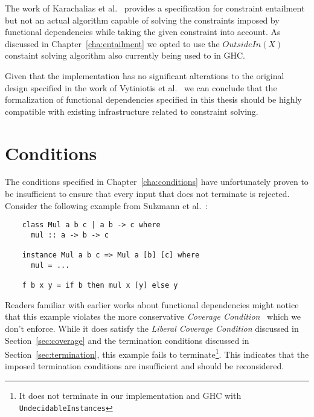 The work of Karachalias et al.~\cite{Karachalias:2017:EFD:3156695.3122966}
provides a specification for constraint entailment but not an actual algorithm
capable of solving the constraints imposed by functional dependencies while
taking the given constraint into account. As discussed in
Chapter~\ref{cha:entailment} we opted to use the $OutsideIn(X)$ constaint solving
algorithm also currently being used to in GHC.

Given that the implementation has no significant alterations to the original
design specified in the work of Vytiniotis et
al.~\cite{outsideinx-modular-type-inference-with-local-assumptions} we can
conclude that the formalization of functional dependencies specified in this
thesis should be highly compatible with existing infrastructure related to
constraint solving.



\section{Conditions}

The conditions specified in Chapter~\ref{cha:conditions} have unfortunately
proven to be insufficient to ensure that every input that does not terminate is
rejected. Consider the following example from Sulzmann et
al.~\cite{fundeps-chrs}:

\begin{verbatim}
    class Mul a b c | a b -> c where
      mul :: a -> b -> c

    instance Mul a b c => Mul a [b] [c] where
      mul = ...

    f b x y = if b then mul x [y] else y
\end{verbatim}

Readers familiar with earlier works about functional dependencies might notice
that this example violates the more conservative \textit{Coverage
Condition}~\cite{fundeps-chrs} which we don't enforce. While it does satisfy the
\textit{Liberal Coverage Condition} discussed in Section~\ref{sec:coverage} and
the termination conditions discussed in Section~\ref{sec:termination}, this
example fails to terminate\footnote{It does not terminate in our implementation
and GHC with \texttt{UndecidableInstances}}. This indicates that the imposed
termination conditions are insufficient and should be reconsidered.

